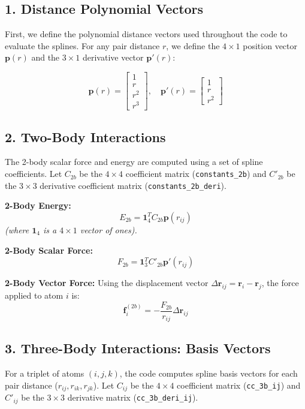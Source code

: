 \documentclass[12pt]{article}
\begin{document}
\subsection*{1. Distance Polynomial Vectors}
First, we define the polynomial distance vectors used throughout the code to evaluate the splines. For any pair distance $r$, we define the $4 \times 1$ position vector $\mathbf{p}(r)$ and the $3 \times 1$ derivative vector $\mathbf{p}'(r)$:

\begin{equation}
\mathbf{p}(r) = \begin{bmatrix} 1 \\ r \\ r^2 \\ r^3 \end{bmatrix}, \quad 
\mathbf{p}'(r) = \begin{bmatrix} 1 \\ r \\ r^2 \end{bmatrix}
\end{equation}

\subsection*{2. Two-Body Interactions}
The 2-body scalar force and energy are computed using a set of spline coefficients. Let $C_{2b}$ be the $4 \times 4$ coefficient matrix (\texttt{constants\_2b}) and $C'_{2b}$ be the $3 \times 3$ derivative coefficient matrix (\texttt{constants\_2b\_deri}).

\textbf{2-Body Energy:}
\begin{equation}
E_{2b} = \mathbf{1}_{4}^T C_{2b} \mathbf{p}(r_{ij})
\end{equation}
\textit{(where $\mathbf{1}_{4}$ is a $4 \times 1$ vector of ones).}

\textbf{2-Body Scalar Force:}
\begin{equation}
F_{2b} = \mathbf{1}_{3}^T C'_{2b} \mathbf{p}'(r_{ij})
\end{equation}

\textbf{2-Body Vector Force:}
Using the displacement vector $\Delta\mathbf{r}_{ij} = \mathbf{r}_i - \mathbf{r}_j$, the force applied to atom $i$ is:
\begin{equation}
\mathbf{f}_{i}^{(2b)} = -\frac{F_{2b}}{r_{ij}} \Delta\mathbf{r}_{ij}
\end{equation}

\subsection*{3. Three-Body Interactions: Basis Vectors}
For a triplet of atoms $(i, j, k)$, the code computes spline basis vectors for each pair distance ($r_{ij}, r_{ik}, r_{jk}$). Let $C_{ij}$ be the $4 \times 4$ coefficient matrix (\texttt{cc\_3b\_ij}) and $C'_{ij}$ be the $3 \times 3$ derivative matrix (\texttt{cc\_3b\_deri\_ij}). 
\end{document}
